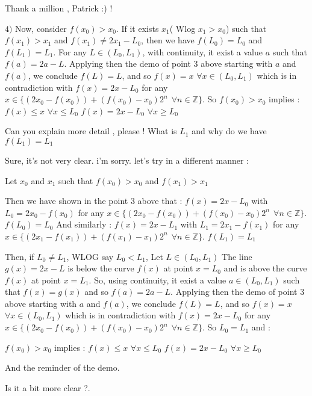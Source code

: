 \begin{mysolution}
	\begin{tcolorbox}Thank a million , Patrick  :)  ! 
\begin{tcolorbox}
$ 4)$ Now, consider $ f(x_0) > x_0$. If it exists $ x_1$( Wlog $ x_1 > x_0$) such that $ f(x_1) > x_1$ and $ f(x_1)\neq 2x_1 - L_0$, then we have $ f(L_0) = L_0$ and $ f(L_1) = L_1$.
For any $ L\in(L_0,L_1)$, with continuity, it exist a value $ a$ such that $ f(a) = 2a - L$. Applying then the demo of point 3 above starting with $ a$ and $ f(a)$, we conclude $ f(L) = L$, and so $ f(x) = x$ $ \forall x\in(L_0,L_1)$ which is in contradiction with $ f(x) = 2x - L_0$ for any $ x\in\{(2x_0 - f(x_0)) + (f(x_0) - x_0)2^n\: \: \forall n\in\mathbb{Z}\}$.
So $ f(x_0) > x_0$  implies :
$ f(x)\leq x$ $ \forall x\leq L_0$
$ f(x) = 2x - L_0$ $ \forall x\geq L_0$
\end{tcolorbox}
Can you explain more detail , please ! What is $ L_1$ and why do we have $ f(L_1) = L_1$\end{tcolorbox}

Sure, it's not very clear. i'm sorry.
let's try in a different manner :

Let $ x_0$ and $ x_1$ such that $ f(x_0)>x_0$ and $ f(x_1)>x_1$

Then we have shown in the point 3 above that :
$ f(x) = 2x - L_0$ with $ L_0 = 2x_0 - f(x_0)$ for any $ x\in\{(2x_0 - f(x_0)) + (f(x_0) - x_0)2^n\: \: \forall n\in\mathbb{Z}\}$.
$ f(L_0)=L_0$
And similarly :
$ f(x) = 2x - L_1$ with $ L_1 = 2x_1 - f(x_1)$ for any $ x\in\{(2x_1 - f(x_1)) + (f(x_1) - x_1)2^n\: \: \forall n\in\mathbb{Z}\}$.
$ f(L_1)=L_1$

Then, if $ L_0\neq L_1$, WLOG say $ L_0<L_1$, Let $ L\in(L_0,L_1)$
The line $ g(x)=2x-L$ is below the curve $ f(x)$ at point $ x=L_0$ and is above the curve $ f(x)$ at point $ x=L_1$.
So, using continuity, it exist a value $ a\in(L_0,L_1)$ such that $ f(x)=g(x)$ and so $ f(a) = 2a - L$. Applying then the demo of point 3 above starting with $ a$ and $ f(a)$, we conclude $ f(L) = L$, and so $ f(x) = x$ $ \forall x\in(L_0,L_1)$ which is in contradiction with $ f(x) = 2x - L_0$ for any $ x\in\{(2x_0 - f(x_0)) + (f(x_0) - x_0)2^n\: \: \forall n\in\mathbb{Z}\}$.
So $ L_0=L_1$ and :

$ f(x_0) > x_0$  implies :
$ f(x)\leq x$ $ \forall x\leq L_0$
$ f(x) = 2x - L_0$ $ \forall x\geq L_0$

And the reminder of the demo.

Is it a bit more clear ?.
\end{mysolution}



